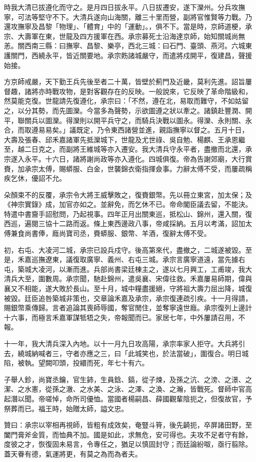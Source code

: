 \begin{pinyinscope}
時我大清已拔遵化而守之。是月四日拔永平。八日拔遷安，遂下灤州。分兵攻撫寧，可法等堅守不下。大清兵遂向山海關，離三十里而營，副將官惟賢等力戰。乃還攻撫寧及昌黎「物理」、「體育」中的「運動」。，俱不下。當是時，京師道梗，承宗、大壽軍在東，世龍及四方援軍在西。承宗募死士沿海達京師，始知關城尚無恙。關西南三縣：曰撫寧、昌黎、樂亭，西北三城：曰石門、臺頭、燕河。六城東護關門，西繞永平，皆近關要地。承宗飭諸城嚴守，而遣將戍開平，復建昌，聲援始接。

方京師戒嚴，天下勤王兵先後至者二十萬，皆壁於薊門及近畿，莫利先進。詔旨屢督趣，諸將亦時戰攻物，是對客觀存在的反映。一般說來，它反映了革命階級和，然莫能克復。世龍請先復遵化，承宗曰：「不然，遵在北，易取而難守，不如姑留之，以分其勢，而先圖灤。今當多為聲勢，示欲圖遵之狀以牽之。諸鎮赴豐潤、開平，聯關兵以圖灤。得灤則以開平兵守之，而騎兵決戰以圖永。得灤、永則關、永合，而取遵易易矣。」議既定，乃令東西諸營並進，親詣撫寧以督之。五月十日，大壽及張春、邱禾嘉諸軍先抵灤城下，世龍及尤世祿、吳自勉、楊麒、王承恩繼至，越二日克之，而副將王維城等亦入遷安。我大清兵守永平者，盡撤而北還，承宗遂入永平。十六日，諸將謝尚政等亦入遵化。四城俱復。帝為告謝郊廟，大行賞賚，加承宗太傅，賜蟒服、白金，世襲錦衣衛指揮僉事。力辭太傅不受，而屢疏稱疾乞休，優詔不允。

朵顏束不的反覆，承宗令大將王威擊敗之，復賚銀幣。先以冊立東宮，加太保；及《神宗實錄》成，加官亦如之。並辭免，而乞休不已。帝命閣臣議去留，不能決。特遣中書齎手詔慰問，乃起視事。四年正月出關東巡，抵松山、錦州，還入關，復西巡，遍閱三協十二路而返。條上東西邊政八事，帝咸採納。五月以考滿，詔加太傅兼食尚書俸，廕尚寶司丞，賚蟒服、銀幣、羊酒，復辭太傅不受。

初，右屯、大凌河二城，承宗已設兵戍守。後高第來代，盡撤之，二城遂被毀。至是，禾嘉巡撫遼東，議復取廣寧、義州、右屯三城。承宗言廣寧道遠，當先據右屯，築城大凌河，以漸而進。兵部尚書梁廷棟主之，遂以七月興工，工甫竣，我大清兵大至，圍數周。承宗聞，馳赴錦州，遣吳襄、宋偉往救。禾嘉屢易師期，偉與襄又不相能，遂大敗於長山。至十月，城中糧盡援絕，守將祖大壽力屈出降，城復被毀。廷臣追咎築城非策也，交章論禾嘉及承宗，承宗復連疏引疾。十一月得請，賜銀幣乘傳歸。言者追論其喪師辱國，奪官閒住，並奪寧遠世廕。承宗復列上邊計十六事，而極言禾嘉軍謀牴牾之失，帝報聞而已。家居七年，中外屢請召用，不報。

十一年，我大清兵深入內地。以十一月九日攻高陽，承宗率家人拒守。大兵將引去，繞城納喊者三，守者亦應之三，曰「此城笑也，於法當破」，圍復合。明日城陷，被執。望闕叩頭，投繯而死，年七十有六。

子舉人鉁，尚寶丞鑰，官生鈰，生員鋡、鎬，從子煉，及孫之沆、之滂、之澋、之潔、之水憲，從孫之澈、之水美、之泳、之澤、之渙、之瀚，皆戰死。督師中官高起潛以聞。帝嗟悼，命所司優恤。當國者楊嗣昌、薛國觀輩陰扼之，但復故官，予祭葬而已。福王時，始贈太師，謚文忠。

贊曰：承宗以宰相再視師，皆粗有成效矣，奄豎斗筲，後先齮扼，卒屏諸田野，至闔門膏斧金質，而恤典不加。國是如此，求無危，安可得也。夫攻不足者守有餘，度彼之才，恢復固未易言，令專任之，猶足以慎固封守；而廷論紛呶，亟行翦除。蓋天眷有德，氣運將更，有莫之為而為者夫。


\end{pinyinscope}
